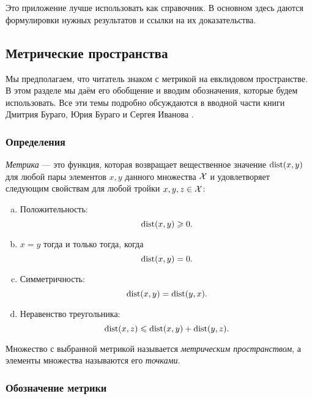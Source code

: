 \chapter[Приложение]{}
\chaptermark{}

\begin{multicols}{2}
{\footnotesize

Это приложение лучше использовать как справочник.
В основном здесь даются формулировки нужных результатов и ссылки на их доказательства.

\section{Метрические пространства}\label{sec:metric-spcaes}

Мы предполагаем, что читатель знаком с метрикой на евклидовом пространстве. 
В этом разделе мы даём его обобщение и вводим обозначения, которые будем использовать.
Все эти темы подробно обсуждаются в вводной части книги Дмитрия Бураго, Юрия Бураго и Сергея Иванова \cite{burago-burago-ivanov}.

\subsection*{Определения}

\emph{Метрика} --- это функция, которая возвращает вещественное значение $\mathop{\rm dist}\nolimits(x,y)$ для любой пары элементов $x,y$ данного множества $\mathcal{X}$ и удовлетворяет следующим свойствам для любой тройки $x,y,z\in\mathcal{X}$: \label{page:def:metric}
\begin{enumerate}[(a)]
\item\label{def:metric-space:a}
Положительность: 
$$\mathop{\rm dist}\nolimits(x,y)\geqslant 0.$$
\item\label{def:metric-space:b}
$x=y$ тогда и только тогда, когда 
$$\mathop{\rm dist}\nolimits(x,y)=0.$$
\item\label{def:metric-space:c}
Симметричность: $$\mathop{\rm dist}\nolimits(x, y) = \mathop{\rm dist}\nolimits(y, x).$$
\item\label{def:metric-space:d}
Неравенство треугольника: 
$$\mathop{\rm dist}\nolimits(x, z) \leqslant \mathop{\rm dist}\nolimits(x, y) + \mathop{\rm dist}\nolimits(y, z).$$
\end{enumerate}

{\sloppy

Множество с выбранной метрикой называется \emph{метрическим пространством}, а элементы множества называются его \emph{точками}.

}

\subsection*{Обозначение метрики}

}
\end{multicols}
